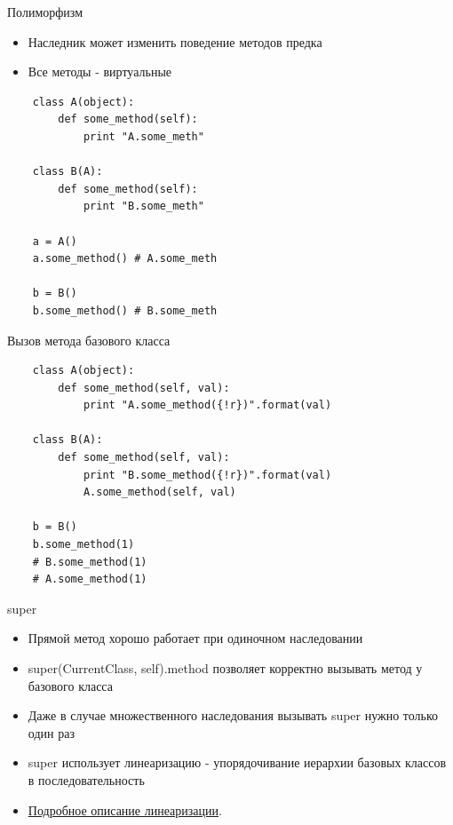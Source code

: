 \documentclass{article}
\begin{document}
\begin{center} Полиморфизм \end{center}
\begin{itemize}
    \item Наследник может изменить поведение методов предка
    \item Все методы - виртуальные
\end{itemize}
{
\Large
\vspace{15pt}
\begin{lstlisting}
    class A(object):
        def some_method(self):
            print "A.some_meth"

    class B(A):
        def some_method(self):
            print "B.some_meth"

    a = A() 
    a.some_method() # A.some_meth

    b = B() 
    b.some_method() # B.some_meth
\end{lstlisting}
}
\newpage

\begin{center} Вызов метода базового класса \end{center}
\vspace{15pt}
\begin{lstlisting}
    class A(object):
        def some_method(self, val):
            print "A.some_method({!r})".format(val)

    class B(A):
        def some_method(self, val):
            print "B.some_method({!r})".format(val)
            A.some_method(self, val)

    b = B() 
    b.some_method(1)
    # B.some_method(1)
    # A.some_method(1)
\end{lstlisting}
\newpage

\begin{center} super \end{center}
\begin{itemize}
    \item Прямой метод хорошо работает при одиночном наследовании
    \item super(CurrentClass, self).method позволяет корректно вызывать 
            метод у базового класса
    \item Даже в случае множественного наследования вызывать super нужно только один раз
    \item super использует линеаризацию - упорядочивание иерархии базовых классов в последовательность
    \item \href{http://www.python.org/download/releases/2.3/mro/}{Подробное описание линеаризации}.
\end{itemize}
\newpage
\end{document}
